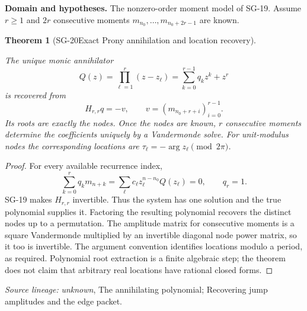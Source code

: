\documentclass[11pt]{article}
\newtheorem{theorem}{Theorem}[section]
\theoremstyle{definition}\newtheorem{definition}[theorem]{Definition}
\theoremstyle{remark}\newtheorem{remark}[theorem]{Remark}
\begin{document}
\par{\small\textbf{Domain and hypotheses.} The nonzero-order moment model of SG-19. Assume $r\ge1$ and $2r$ consecutive moments $m_{n_0},\ldots,m_{n_0+2r-1}$ are known.}\par
\begin{theorem}[SG-20\quad Exact Prony annihilation and location recovery]\label{SG-20}

The unique monic annihilator
\[
 Q(z)=\prod_{\ell=1}^r(z-z_\ell)=\sum_{k=0}^{r-1}q_kz^k+z^r
\]
is recovered from
\[
 H_{r,r}q=-v,\qquad v=(m_{n_0+r+i})_{i=0}^{r-1}.
\]
Its roots are exactly the nodes. Once the nodes are known, $r$ consecutive
moments determine the coefficients uniquely by a Vandermonde solve.
For unit-modulus nodes the corresponding locations are
$\tau_\ell=-\arg z_\ell\pmod{2\pi}$.

\end{theorem}
\begin{proof}

For every available recurrence index,
\[
 \sum_{k=0}^rq_km_{n+k}
 =\sum_\ell c_\ell z_\ell^{n-n_0}Q(z_\ell)=0,
 \qquad q_r=1.
\]
SG-19 makes $H_{r,r}$ invertible. Thus the system has one solution and the
true polynomial supplies it. Factoring the resulting polynomial recovers the
distinct nodes up to a permutation. The amplitude matrix for consecutive
moments is a square Vandermonde multiplied by an invertible diagonal node
power matrix, so it too is invertible. The argument convention identifies
locations modulo a period, as required. Polynomial root extraction is a
finite algebraic step; the theorem does not claim that arbitrary real
locations have rational closed forms.

\end{proof}

\par{\small\color{Teal}\textit{Source lineage:} \textit{unknown}, The annihilating polynomial; Recovering jump amplitudes and the edge packet.}\par
\end{document}
